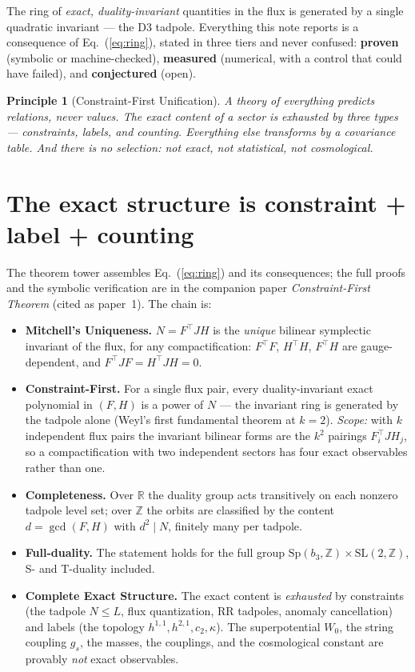 \documentclass[11pt]{article}
\newtheorem{principle}{Principle}
\newcommand{\bthree}{b_3}
\newcommand{\flux}{F}
\newcommand{\hh}{H}
\begin{document}
The ring of \emph{exact, duality-invariant} quantities in the flux is generated by a single
quadratic invariant --- the D3 tadpole. Everything this note reports is a consequence of
Eq.~(\ref{eq:ring}), stated in three tiers and never confused: \textbf{proven} (symbolic or
machine-checked), \textbf{measured} (numerical, with a control that could have failed), and
\textbf{conjectured} (open).

\begin{principle}[Constraint-First Unification]
\label{pr:main}
A theory of everything predicts relations, never values. The exact content of a sector is
exhausted by three types --- constraints, labels, and counting. Everything else transforms by a
covariance table. And there is no selection: not exact, not statistical, not cosmological.
\end{principle}

\section{The exact structure is constraint + label + counting}

The theorem tower assembles Eq.~(\ref{eq:ring}) and its consequences; the full proofs and the
symbolic verification are in the companion paper \emph{Constraint-First Theorem}
(cited as paper~1). The chain is:

\begin{itemize}
\item \textbf{Mitchell's Uniqueness.} $N=\flux^\top J\hh$ is the \emph{unique} bilinear symplectic
invariant of the flux, for any compactification: $\flux^\top\flux$, $\hh^\top\hh$, $\flux^\top\hh$
are gauge-dependent, and $\flux^\top J\flux=\hh^\top J\hh=0$.
\item \textbf{Constraint-First.} For a single flux pair, every duality-invariant exact polynomial in
$(\flux,\hh)$ is a power of $N$ --- the invariant ring is generated by the tadpole alone (Weyl's
first fundamental theorem at $k=2$). \emph{Scope:} with $k$ independent flux pairs the invariant
bilinear forms are the $k^2$ pairings $\flux_i^\top J\hh_j$, so a compactification with two independent
sectors has four exact observables rather than one.
\item \textbf{Completeness.} Over $\mathbb{R}$ the duality group acts transitively on each nonzero
tadpole level set; over $\mathbb{Z}$ the orbits are classified by the content $d=\gcd(\flux,\hh)$
with $d^2\mid N$, finitely many per tadpole.
\item \textbf{Full-duality.} The statement holds for the full group
$\mathrm{Sp}(\bthree,\mathbb{Z})\times\mathrm{SL}(2,\mathbb{Z})$, S- and T-duality included.
\item \textbf{Complete Exact Structure.} The exact content is \emph{exhausted} by constraints (the
tadpole $N\le L$, flux quantization, RR tadpoles, anomaly cancellation) and labels (the topology
$h^{1,1},h^{2,1},c_2,\kappa$). The superpotential $W_0$, the string coupling $g_s$, the masses,
the couplings, and the cosmological constant are provably \emph{not} exact observables.
\end{itemize}
\end{document}
